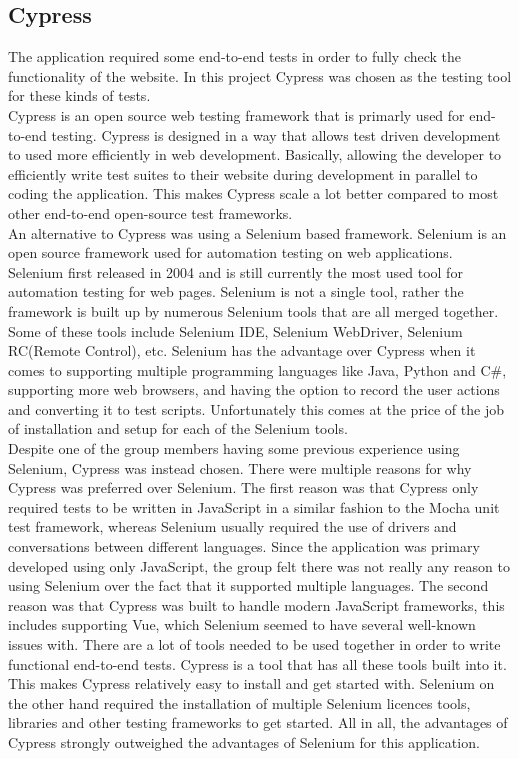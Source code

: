 \subsection{Cypress}
The application required some end-to-end tests in order to fully check the functionality of the website. In this project Cypress was chosen as the testing tool for these kinds of tests.
\\[11pt]
Cypress is an open source web testing framework that is primarly used for end-to-end testing. Cypress is designed in a way that allows test driven development to used more efficiently in web development. Basically, allowing the developer to efficiently write test suites to their website during development in parallel to coding the application. This makes Cypress scale a lot better compared to most other end-to-end open-source test frameworks.\cite{Cypress:MainPage,Cypress:howItWorks}
\\[11pt]
An alternative to Cypress was using a Selenium based framework. Selenium is an open source framework used for automation testing on web applications. Selenium first released in 2004 and is still currently the most used tool for automation testing for web pages. Selenium is not a single tool, rather the framework is built up by numerous Selenium tools that are all merged together. Some of these tools include Selenium IDE, Selenium WebDriver, Selenium RC(Remote Control), etc. Selenium has the advantage over Cypress when it comes to supporting multiple programming languages like Java, Python and C\#, supporting more web browsers, and having the option to record the user actions and converting it to test scripts. Unfortunately this comes at the price of the job of installation and setup for each of the Selenium tools.\cite{Selenium:Intro,Selenium:Wiki}
\\[11pt]
Despite one of the group members having some previous experience using Selenium, Cypress was instead chosen. There were multiple reasons for why Cypress was preferred over Selenium. The first reason was that Cypress only required tests to be written in JavaScript in a similar fashion to the Mocha unit test framework, whereas Selenium usually required the use of drivers and conversations between different languages. Since the application was primary developed using only JavaScript, the group felt there was not really any reason to using Selenium over the fact that it supported multiple languages. The second reason was that Cypress was built to handle modern JavaScript frameworks, this includes supporting Vue, which Selenium seemed to have several well-known issues with. There are a lot of tools needed to be used together in order to write functional end-to-end tests. Cypress is a tool that has all these tools built into it. This makes Cypress relatively easy to install and get started with. Selenium on the other hand required the installation of multiple Selenium licences tools, libraries and other testing frameworks to get started. All in all, the advantages of Cypress strongly outweighed the advantages of Selenium for this application.\cite{CypressVsSelenium}
